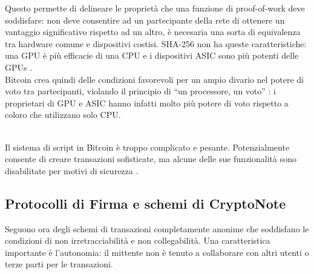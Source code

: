 Questo permette di delineare le proprietà che una funzione di
proof-of-work deve soddisfare: non deve consentire ad un partecipante
della rete di ottenere un vantaggio significativo rispetto ad un altro,
è necesaria una sorta di equivalenza tra hardware comune e dispositivi
costisi. SHA-256 non ha queste caratteristiche: una GPU è più efficacie
di una CPU e i dispositivi ASIC sono più potenti delle GPUs
\cite{mining_hardware}.\\
Bitcoin crea quindi delle condizioni favorevoli per un ampio divario nel
potere di voto tra partecipanti, violando il principio di ``un
processore, un voto'' : i proprietari di GPU e ASIC hanno infatti molto
più potere di voto rispetto a coloro che utilizzano solo CPU.\\
\strut \\
Il sistema di script in Bitcoin è troppo complicato e pesante.
Potenzialmente consente di creare transazioni sofisticate, ma alcune
delle sue funzionalità sono disabilitate per motivi di
sicurezza\cite{contracts} \cite{script}.

\subsection{Protocolli di Firma e schemi di
CryptoNote}\label{protocolli-di-firma-e-schemi-di-cryptonote}

Seguono ora degli schemi di transazioni completamente anonime che
soddisfano le condizioni di non irretracciabilità e non collegabilità.
Una caratteristica importante è l'autonomia: il mittente non è tenuto a
collaborare con altri utenti o terze parti per le transazioni.

